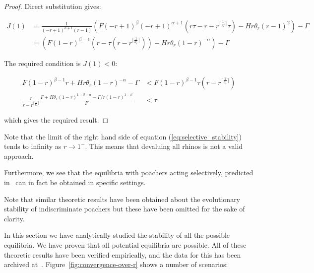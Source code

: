 \documentclass[10pt]{article}
\begin{document}
\begin{proof}
Direct substitution gives:

    \begin{align}
    J(1) &= \frac{1}{\left(- r + 1\right)^{\alpha + 1} \left(r - 1\right)}
                \left(
                    F \left(- r + 1\right)^{\beta}
                    \left(- r + 1\right)^{\alpha + 1}
                    \left(
                        r \tau -
                        r -
                        r^{\lceil{\frac{1}{\theta_{r}}}\rceil} \tau
                    \right)
                    - H r
                    \theta_{r}
                    \left(r - 1\right)^{2}
                \right) - \Gamma\\
		&= \left(F
                 \left(1 - r\right)^{\beta - 1}
                 \left(
                     r -
                     \tau(r - r^{\lceil{\frac{1}{\theta_{r}}}\rceil} )
                 \right) +
                 H r \theta_{r} \left(1 - r\right)^{-\alpha}
           \right)
           - \Gamma
    \end{align}

The required condition is \(J(1)<0\):

\begin{align}
    F
    \left(1 - r\right)^{\beta - 1}r +
    H r \theta_{r}
    \left(1 - r\right)^{-\alpha}
    - \Gamma
            & < F \left(1 - r\right)^{\beta - 1}
    \tau(r - r^{\lceil{\frac{1}{\theta_{r}}}\rceil} )\\
    \frac{r}{r - r^{\lceil{\frac{1}{\theta_{r}}}\rceil}}
    \frac{F + H \theta_{r} \left(1 - r\right)^{1-\beta-\alpha} -
    \Gamma/r(1-r)^{1-\beta}}{F} & < \tau
\end{align}

which gives the required result.
\end{proof}

Note that the limit of the right hand side of equation (\ref{eq:selective_stability})
tends to infinity as \(r\to1^-\). This means that devaluing all rhinos is not
a valid approach.

Furthermore, we see that the equilibria with poachers acting selectively,
predicted in~\cite{Lee} can in fact be obtained in specific settings.

Note that similar theoretic results have been obtained about the evolutionary
stability of indiscriminate poachers but these have been omitted for the sake of
clarity.

In this section we have analytically studied the stability of all the possible
equilibria. We have proven that all potential equilibria are possible.  All of
these theoretic results have been verified empirically, and the data for this
has been archived at~\cite{Glynatsi2017}. %
Figure~\ref{fig:convergence-over-r} shows a number of scenarios:
\end{document}
